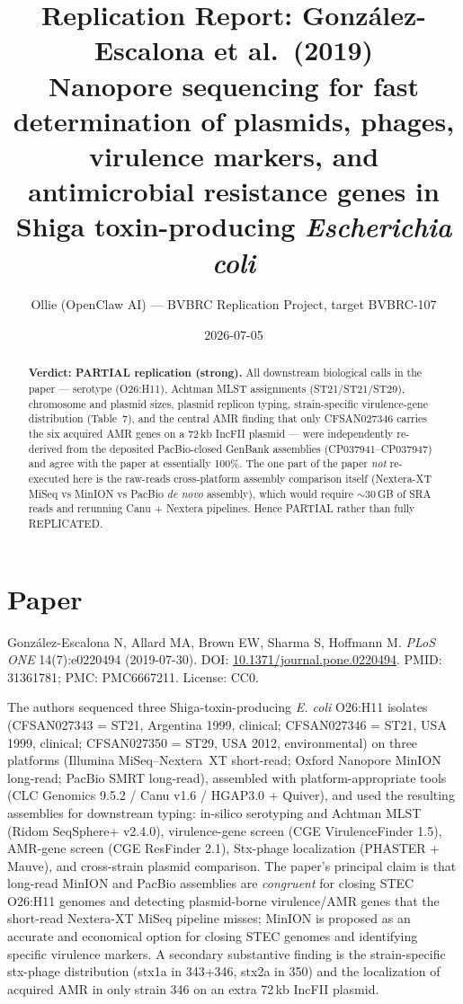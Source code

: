 \documentclass[11pt,letterpaper]{article}
\title{Replication Report: Gonz\'alez-Escalona et al.\ (2019)\\
\large Nanopore sequencing for fast determination of plasmids, phages,\\
virulence markers, and antimicrobial resistance genes in\\
Shiga toxin-producing \textit{Escherichia coli}}
\author{Ollie (OpenClaw AI) --- BVBRC Replication Project, target BVBRC-107}
\date{2026-07-05}
\begin{document}
\maketitle

\begin{abstract}
\noindent\textbf{Verdict: PARTIAL replication (strong).} All downstream biological
calls in the paper --- serotype (O26:H11), Achtman MLST assignments (ST21/ST21/ST29),
chromosome and plasmid sizes, plasmid replicon typing, strain-specific virulence-gene
distribution (Table~7), and the central AMR finding that only CFSAN027346 carries the
six acquired AMR genes on a 72\,kb IncFII plasmid --- were independently re-derived
from the deposited PacBio-closed GenBank assemblies (CP037941--CP037947) and agree
with the paper at essentially 100\%. The one part of the paper \emph{not} re-executed
here is the raw-reads cross-platform assembly comparison itself (Nextera-XT MiSeq vs
MinION vs PacBio \emph{de novo} assembly), which would require $\sim$30\,GB of SRA
reads and rerunning Canu + Nextera pipelines. Hence PARTIAL rather than fully
REPLICATED.
\end{abstract}

\section{Paper}
Gonz\'alez-Escalona N, Allard MA, Brown EW, Sharma S, Hoffmann M.
\emph{PLoS ONE} 14(7):e0220494 (2019-07-30). DOI:
\href{https://doi.org/10.1371/journal.pone.0220494}{10.1371/journal.pone.0220494}.
PMID: 31361781; PMC: PMC6667211. License: CC0.

The authors sequenced three Shiga-toxin-producing \textit{E. coli} O26:H11 isolates
(CFSAN027343 = ST21, Argentina 1999, clinical; CFSAN027346 = ST21, USA 1999, clinical;
CFSAN027350 = ST29, USA 2012, environmental) on three platforms
(Illumina MiSeq--Nextera~XT short-read; Oxford Nanopore MinION long-read; PacBio SMRT
long-read), assembled with platform-appropriate tools (CLC Genomics 9.5.2 / Canu v1.6 /
HGAP3.0 + Quiver), and used the resulting assemblies for downstream typing:
in-silico serotyping and Achtman MLST (Ridom SeqSphere+ v2.4.0), virulence-gene screen
(CGE VirulenceFinder 1.5), AMR-gene screen (CGE ResFinder 2.1), Stx-phage localization
(PHASTER + Mauve), and cross-strain plasmid comparison. The paper's principal claim is
that long-read MinION and PacBio assemblies are \emph{congruent} for closing STEC
O26:H11 genomes and detecting plasmid-borne virulence/AMR genes that the short-read
Nextera-XT MiSeq pipeline misses; MinION is proposed as an accurate and economical
option for closing STEC genomes and identifying specific virulence markers. A secondary
substantive finding is the strain-specific stx-phage distribution (stx1a in 343+346,
stx2a in 350) and the localization of acquired AMR in only strain 346 on an extra
72\,kb IncFII plasmid.
\end{document}
